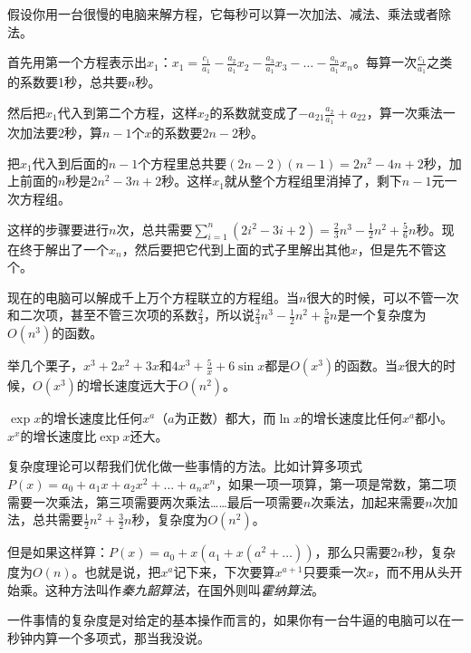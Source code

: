 假设你用一台很慢的电脑来解方程，它每秒可以算一次加法、减法、乘法或者除法。

首先用第一个方程表示出$x_1$：$x_1=\frac{c_1}{a_1}-\frac{a_2}{a_1} x_2-\frac{a_3}{a_1} x_3-\dots-\frac{a_n}{a_1} x_n$。每算一次$\frac{c_1}{a_1}$之类的系数要1秒，总共要$n$秒。

然后把$x_1$代入到第二个方程，这样$x_2$的系数就变成了$-a_{2 1} \frac{a_2}{a_1}+a_{2 2}$，算一次乘法一次加法要2秒，算$n-1$个$x$的系数要$2n-2$秒。

把$x_1$代入到后面的$n-1$个方程里总共要$(2n-2)(n-1)=2n^2-4n+2$秒，加上前面的$n$秒是$2n^2-3n+2$秒。这样$x_1$就从整个方程组里消掉了，剩下$n-1$元一次方程组。

这样的步骤要进行$n$次，总共需要$\sum_{i=1}^n(2i^2-3i+2)=\frac{2}{3} n^3-\frac{1}{2} n^2+\frac{5}{6} n$秒。现在终于解出了一个$x_n$，然后要把它代到上面的式子里解出其他$x$，但是先不管这个。

现在的电脑可以解成千上万个方程联立的方程组。当$n$很大的时候，可以不管一次和二次项，甚至不管三次项的系数$\frac{2}{3}$，所以说$\frac{2}{3} n^3-\frac{1}{2} n^2+\frac{5}{6} n$是一个复杂度为$O(n^3)$的函数。

举几个栗子，$x^3+2x^2+3x$和$4x^3+\frac{5}{x}+6 \sin x$都是$O(x^3)$的函数。当$x$很大的时候，$O(x^3)$的增长速度远大于$O(n^2)$。

$\exp x$的增长速度比任何$x^a$（$a$为正数）都大，而$\ln x$的增长速度比任何$x^a$都小。$x^x$的增长速度比$\exp x$还大。

复杂度理论可以帮我们优化做一些事情的方法。比如计算多项式$P(x)=a_0+a_1 x+a_2 x^2+\dots+a_n x^n$，如果一项一项算，第一项是常数，第二项需要一次乘法，第三项需要两次乘法……最后一项需要$n$次乘法，加起来需要$n$次加法，总共需要$\frac{1}{2} n^2+\frac{3}{2} n$秒，复杂度为$O(n^2)$。

但是如果这样算：$P(x)=a_0+x (a_1+x (a^2+\dots))$，那么只需要$2 n$秒，复杂度为$O(n)$。也就是说，把$x^a$记下来，下次要算$x^{a+1}$只要乘一次$x$，而不用从头开始乘。这种方法叫作\emph{秦九韶算法}，在国外则叫\emph{霍纳算法}。

一件事情的复杂度是对给定的基本操作而言的，如果你有一台牛逼的电脑可以在一秒钟内算一个多项式，那当我没说。
